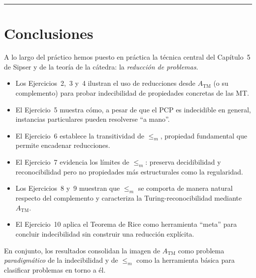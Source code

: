 \documentclass[11pt,a4paper]{article}
\theoremstyle{plain}
\theoremstyle{definition}
\theoremstyle{remark}
\newcommand{\TM}{\mathrm{TM}}
\newcommand{\redm}{\le_{m}}
\newcommand{\ATM}{A_{\TM}}
\begin{document}
\bigskip\hrule\bigskip

\section*{Conclusiones}

A lo largo del pr\'actico hemos puesto en pr\'actica la t\'ecnica central
del Cap\'itulo~5 de Sipser y de la teor\'ia de la c\'atedra: la
\emph{reducci\'on de problemas}.

\begin{itemize}
  \item Los Ejercicios~2,~3 y~4 ilustran el uso de reducciones desde
        $\ATM$ (o su complemento) para probar indecibilidad de
        propiedades concretas de las MT.
  \item El Ejercicio~5 muestra c\'omo, a pesar de que el PCP es
        indecidible en general, instancias particulares pueden resolverse
        ``a mano''.
  \item El Ejercicio~6 establece la transitividad de $\redm$, propiedad
        fundamental que permite encadenar reducciones.
  \item El Ejercicio~7 evidencia los l\'imites de $\redm$: preserva
        decidibilidad y reconocibilidad pero no propiedades m\'as
        estructurales como la regularidad.
  \item Los Ejercicios~8 y~9 muestran que $\redm$ se comporta de manera
        natural respecto del complemento y caracteriza la
        Turing-reconocibilidad mediante $\ATM$.
  \item El Ejercicio~10 aplica el Teorema de Rice como herramienta
        ``meta'' para concluir indecibilidad sin construir una reducci\'on
        expl\'icita.
\end{itemize}

En conjunto, los resultados consolidan la imagen de $\ATM$ como problema
\emph{paradigm\'atico} de la indecibilidad y de $\redm$ como la herramienta
b\'asica para clasificar problemas en torno a \'el.
\end{document}
